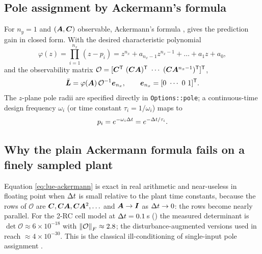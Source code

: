 \subsection{Pole assignment by Ackermann's formula}
For $n_y=1$ and $(\bm{A},\bm{C})$ observable, Ackermann's formula \cite{ackermann1972},
\cite[Sec.~10-6]{ogata2010} gives the prediction gain in closed form.  With the desired
characteristic polynomial
\begin{equation}
\varphi(z) = \prod_{i=1}^{n_x}(z - p_i) = z^{n_x} + a_{n_x-1}z^{n_x-1} + \dots + a_1 z + a_0 ,
\label{eq:lue-charpoly}
\end{equation}
and the observability matrix $\mathcal{O} = [\mC^\T\ (\mC\mA)^\T\ \cdots\
(\mC\mA^{n_x-1})^\T]^\T$,
\begin{equation}
\bar{\bm{L}} = \varphi(\bm{A})\,\mathcal{O}^{-1} \bm{e}_{n_x} ,\qquad
\bm{e}_{n_x} = [0\ \cdots\ 0\ 1]^{\mathsf{T}} .
\label{eq:lue-ackermann}
\end{equation}
The $z$-plane pole radii are specified directly in \texttt{Options::pole}; a continuous-time
design frequency $\omega_i$ (or time constant $\tau_i = 1/\omega_i$) maps to
\begin{equation}
p_i = e^{-\omega_i \Delta t} = e^{-\Delta t/\tau_i} .
\label{eq:lue-polemap}
\end{equation}

\subsection{Why the plain Ackermann formula fails on a finely sampled plant}
\label{sec:lue-cond}
Equation \eqref{eq:lue-ackermann} is exact in real arithmetic and near-useless in floating point
when $\Delta t$ is small relative to the plant time constants, because the rows of $\mathcal{O}$ are
$\bm{C}, \bm{C}\bm{A}, \bm{C}\bm{A}^2, \ldots$ and $\bm{A} \to \bm{I}$ as $\Delta t\to 0$: the rows become nearly parallel.
For the 2-RC cell model at $\Delta t = 0.1$\,s (\Cref{sec:lue-battery}) the measured determinant is
$\det\mathcal{O}\approx 6\times10^{-18}$ with $\left\lVert \mathcal{O} \right\rVert_F\approx 2.8$; the
disturbance-augmented versions used in \Cref{ch:eso,ch:dob} reach $\approx 4\times 10^{-30}$.
This is the classical ill-conditioning of single-input pole assignment
\cite{petkov1984poleassignment,kautsky1985robust}.

